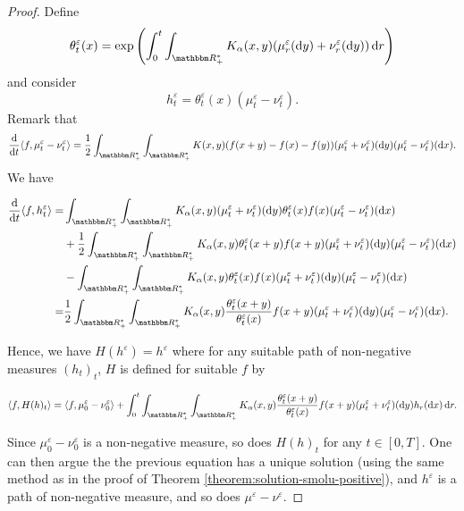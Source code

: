 \documentclass[a4paper,11pt, reqno]{amsart}
\newcommand{\eps}{\varepsilon}
\newcommand{\dd}{\mathop{}\!\mathrm{d}}
\newcommand{\1}{\mathbbm{1}}
\theoremstyle{plain}
\theoremstyle{definition}
\begin{document}
\begin{proof}
  Define
  \[ \theta^{\eps}_t (x) = \exp \left( \int_0^t
     \int_{\RR_+^{\ast}} K_{\alpha} (x, y) (\mu^{\eps}_r (\dd
     y) + \nu^{\eps}_r (\dd y)) \dd r \right) \]
  and consider
  \[ h_t^{\eps} = \theta^{\eps}_t (x) (\mu^{\eps}_t -
     \nu^{\eps}_t) . \]
  Remark that
  \[ \frac{\dd}{\dd t} \langle f, \mu^{\eps}_t -
     \nu^{\eps}_t \rangle = \frac{1}{2} \int_{\RR^{\ast}_+}
     \int_{\RR^{\ast}_+} K (x, y) (f (x + y) - f (x) - f (y))
     (\mu^{\eps}_t + \nu^{\eps}_t) (\dd y)
     (\mu^{\eps}_t - \nu^{\eps}_t) (\dd x) . \]
  We have
  
  \begin{align*}
    \frac{\dd}{\dd t} \langle f, h_t^{\eps} \rangle = &
    \int_{\RR_+^{\ast}} \int_{\RR_+^{\ast}} K_{\alpha} (x, y)
    (\mu^{\eps}_t + \nu^{\eps}_t) (\dd y)
    \theta^{\eps}_t (x) f (x) (\mu^{\eps}_t -
    \nu^{\eps}_t) (\dd x)\\
    & + \frac{1}{2} \int_{\RR_+^{\ast}} \int_{\RR_+^{\ast}}
    K_{\alpha} (x, y) \theta^{\eps}_t (x + y) f (x + y)
    (\mu^{\eps}_t + \nu^{\eps}_t) (\dd y)
    (\mu^{\eps}_t - \nu^{\eps}_t) (\dd x)\\
    & - \int_{\RR_+^{\ast}} \int_{\RR_+^{\ast}} K_{\alpha} (x,
    y) \theta^{\eps}_t (x) f (x) (\mu^{\eps}_t +
    \nu^{\eps}_t) (\dd y) (\mu^{\eps}_t -
    \nu^{\eps}_t) (\dd x)\\
    = & \frac{1}{2} \int_{\RR_+^{\ast}} \int_{\RR_+^{\ast}}
    K_{\alpha} (x, y) \frac{\theta^{\eps}_t (x +
    y)}{\theta^{\eps}_t (x)} f (x + y) (\mu^{\eps}_t +
    \nu^{\eps}_t) (\dd y) (\mu^{\eps}_t -
    \nu^{\eps}_t) (\dd x) .
  \end{align*}
  
  Hence, we have $H (h^{\eps}) = h^{\eps}$ where for any
  suitable path of non-negative measures $(h_t)_t$, $H$ is defined for
  suitable $f$ by
  
  \begin{multline*}
    \langle f, H (h)_t \rangle = \langle f, \mu^{\eps}_0 -
    \nu^{\eps}_0 \rangle + \int_0^t \int_{\RR^{\ast}_+}
    \int_{\RR^{\ast}_+} K_{\alpha} (x, y) \frac{\theta^{\eps}_t
    (x + y)}{\theta^{\eps}_t (x)} f (x + y) (\mu^{\eps}_t +
    \nu^{\eps}_t) (\dd y) h_r (\dd x) \dd r.
  \end{multline*}
  
  Since $\mu^{\eps}_0 - \nu^{\eps}_0$ is a non-negative measure,
  so does $H (h)_t$ for any $t \in [0, T]$. One can then argue the the
  previous equation has a unique solution (using the same method as in the
  proof of Theorem \ref{theorem:solution-smolu-positive}), and
  $h^{\eps}$ is a path of non-negative measure, and so does
  $\mu^{\eps} - \nu^{\eps}$.
\end{proof}
\end{document}
